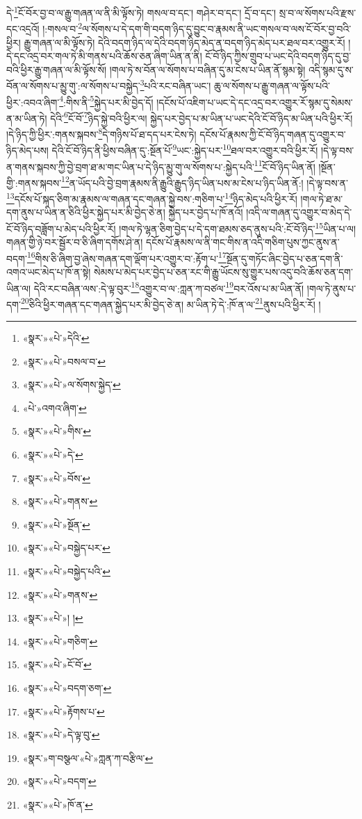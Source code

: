 དེ་\footnote{«སྣར་»«པེ་»དེའི་}ངོ་བོར་བྱ་བ་ལ་རྒྱུ་གཞན་ལ་ནི་མི་ལྟོས་ཏེ། གསལ་བ་དང་། གཤེར་བ་དང་། དྲོ་བ་དང་། སྲ་བ་ལ་སོགས་པའི་རྫས་དང་འདྲའོ། །:གསལ་བ་\footnote{«སྣར་»«པེ་»བསལ་བ་}ལ་སོགས་པ་དེ་དག་གི་བདག་ཉིད་དུ་བྱུང་བ་རྣམས་ནི་ཡང་གསལ་བ་ལས་ངོ་བོར་བྱ་བའི་ཕྱིར། རྒྱུ་གཞན་ལ་མི་ལྟོས་ཏེ། དེའི་བདག་ཉིད་ལ་དེའི་བདག་ཉིད་མེད་ན་བདག་ཉིད་མེད་པར་ཐལ་བར་འགྱུར་རོ། །དེ་དང་འདྲ་བར་གལ་ཏེ་མི་གནས་པའི་ཆོས་ཅན་ཞིག་ཡིན་ན་ནི། ངོ་བོ་ཉིད་ཀྱིས་གྲུབ་པ་ཡང་དེའི་བདག་ཉིད་དུ་བྱ་བའི་ཕྱིར་རྒྱུ་གཞན་ལ་མི་ལྟོས་སོ། །གལ་ཏེ་ས་བོན་ལ་སོགས་པ་བཞིན་དུ་མ་ངེས་པ་ཡིན་ནོ་སྙམ་སྟེ། འདི་སྙམ་དུ་ས་བོན་ལ་སོགས་པ་མྱུ་གུ་:ལ་སོགས་པ་བསྐྱེད་\footnote{«སྣར་»«པེ་»ལ་སོགས་སྐྱེད་}པའི་རང་བཞིན་ཡང་། ཆུ་ལ་སོགས་པ་རྒྱུ་གཞན་ལ་ལྟོས་པའི་ཕྱིར་:འབའ་ཞིག་\footnote{«པེ་»འགའ་ཞིག་}:གིས་ནི་\footnote{«སྣར་»«པེ་»གིས་}སྐྱེད་པར་མི་བྱེད་དོ། །དངོས་པོ་འཇིག་པ་ཡང་དེ་དང་འདྲ་བར་འགྱུར་རོ་སྙམ་དུ་སེམས་ན་མ་ཡིན་ཏེ། དེའི་\footnote{«སྣར་»«པེ་»དེ་}ངོ་བོ་\footnote{«སྣར་»«པེ་»བོས་}ཉིད་སྐྱེ་བའི་ཕྱིར་ལ། སྐྱེད་པར་བྱེད་པ་མ་ཡིན་པ་ཡང་དེའི་ངོ་བོ་ཉིད་མ་ཡིན་པའི་ཕྱིར་རོ། །དེ་ཉིད་ཀྱི་ཕྱིར་:གནས་སྐབས་\footnote{«སྣར་»«པེ་»གནས་}དེ་གཉིས་པོ་ཐ་དད་པར་ངེས་ཏེ། དངོས་པོ་རྣམས་ཀྱི་ངོ་བོ་ཉིད་གཞན་དུ་འགྱུར་བ་ཉིད་མེད་པས། དེའི་ངོ་བོ་ཉིད་ནི་ཕྱིས་བཞིན་དུ་:སྔོན་པོ་\footnote{«སྣར་»«པེ་»སྔོན་}ཡང་:སྐྱེད་པར་\footnote{«སྣར་»«པེ་»བསྐྱེད་པར་}ཐལ་བར་འགྱུར་བའི་ཕྱིར་རོ། །དེ་ལྟ་བས་ན་གནས་སྐབས་ཀྱི་བྱེ་བྲག་ཐ་མ་གང་ཡིན་པ་དེ་ཉིད་མྱུ་གུ་ལ་སོགས་པ་:སྐྱེད་པའི་\footnote{«སྣར་»«པེ་»བསྐྱེད་པའི་}ངོ་བོ་ཉིད་ཡིན་ནོ། །སྔོན་གྱི་:གནས་སྐབས་\footnote{«སྣར་»«པེ་»གནས་}ན་ཡོད་པའི་བྱེ་བྲག་རྣམས་ནི་རྒྱུའི་རྒྱུད་ཉིད་ཡིན་པས་མ་ངེས་པ་ཉིད་ཡིན་ནོ:། །དེ་ལྟ་བས་ན་\footnote{«སྣར་»«པེ་»། །}དངོས་པོ་སྐད་ཅིག་མ་རྣམས་ལ་གཞན་དང་གཞན་སྐྱེ་བས་:གཅིག་པ་\footnote{«སྣར་»«པེ་»གཅིག་}ཉིད་མེད་པའི་ཕྱིར་རོ། །གལ་ཏེ་ཐ་མ་དག་ནུས་པ་ཡིན་ན་ཅིའི་ཕྱིར་སྐྱེད་པར་མི་བྱེད་ཅེ་ན། སྐྱེད་པར་བྱེད་པ་ཁོ་ནའོ། །འདི་ལ་གཞན་དུ་འགྱུར་བ་མེད་དེ་ངོ་བོ་ཉིད་བཟློག་པ་མེད་པའི་ཕྱིར་རོ། །གལ་ཏེ་ལྷན་ཅིག་བྱེད་པ་དེ་དག་ཐམས་ཅད་ནུས་པའི་:ངོ་བོ་ཉིད་\footnote{«སྣར་»«པེ་»ངོ་བོ་}ཡིན་པ་ལ། གཞན་གྱི་ཉེ་བར་སྦྱོར་བ་ཅི་ཞིག་དགོས་ཤེ་ན། དངོས་པོ་རྣམས་ལ་ནི་གང་གིས་ན་འདི་གཅིག་པུས་ཀྱང་ནུས་ན་བདག་\footnote{«སྣར་»«པེ་»བདག་ཅག་}གིས་ཅི་ཞིག་བྱ་ཞེས་གཞན་དག་ལྡོག་པར་འགྱུར་བ་:རྟོག་པ་\footnote{«སྣར་»«པེ་»རྟོགས་པ་}སྔོན་དུ་གཏོང་ཞིང་བྱེད་པ་ཅན་དག་ནི་འགའ་ཡང་མེད་པ་ཁོ་ན་སྟེ། སེམས་པ་མེད་པར་བྱེད་པ་ཅན་རང་གི་རྒྱུ་ཡོངས་སུ་གྱུར་པས་འདུ་བའི་ཆོས་ཅན་དག་ཡིན་ལ། དེའི་རང་བཞིན་ལས་:དེ་ལྟ་བུར་\footnote{«སྣར་»«པེ་»དེ་ལྟ་བུ་}འགྱུར་བ་ལ་:ཀླན་ཀ་བཙལ་\footnote{«སྣར་»ག་བསྩལ་«པེ་»ཀླན་ཀ་བརྩིལ་}བར་འོས་པ་མ་ཡིན་ནོ། །གལ་ཏེ་ནུས་པ་དག་\footnote{«སྣར་»«པེ་»བདག་}ཅིའི་ཕྱིར་གཞན་དང་གཞན་སྐྱེད་པར་མི་བྱེད་ཅེ་ན། མ་ཡིན་ཏེ་དེ་:ཁོ་ན་ལ་\footnote{«སྣར་»«པེ་»ཁོ་ན་}ནུས་པའི་ཕྱིར་རོ། །
